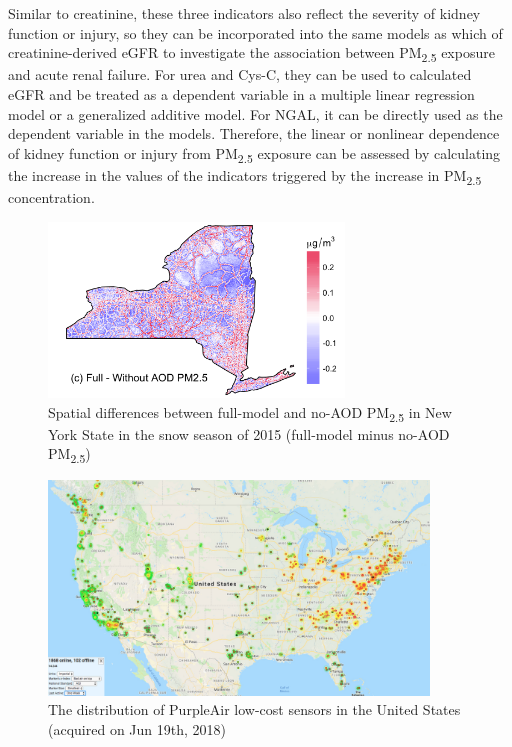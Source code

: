 \documentclass[11pt]{article}
\newcommand{\tsub}{\textsubscript}
\begin{document}
\begin{enumerate*}[{[a)]}]
{\begin{enumerate*}[{[1)]}]
        \end{enumerate*}
    }
    \item Similar to creatinine, these three indicators also reflect the severity of kidney function or injury, so they can be incorporated into the same models as which of creatinine-derived eGFR to investigate the association between PM\tsub{2.5} exposure and acute renal failure. For urea and Cys-C, they can be used to calculated eGFR and be treated as a dependent variable in a multiple linear regression model or a generalized additive model. For NGAL, it can be directly used as the dependent variable in the models. Therefore, the linear or nonlinear dependence of kidney function or injury from PM\tsub{2.5} exposure can be assessed by calculating the increase in the values of the indicators triggered by the increase in PM\tsub{2.5} concentration.
\end{enumerate*}


\newpage

\begin{figure}[H]
    \centering
    \includegraphics[width=0.7\textwidth]{img/no_aod.png}
    \caption{Spatial differences between full-model and no-AOD PM\tsub{2.5} in New York State in the snow season of 2015 (full-model minus no-AOD PM\tsub{2.5})}
    \label{fig:noaod}
\end{figure}

\begin{figure}[H]
    \centering
    \includegraphics[width=0.9\textwidth]{img/purpleair.jpg}
    \caption{The distribution of PurpleAir low-cost sensors in the United States (acquired on Jun 19th, 2018)}
    \label{fig:pa}
\end{figure}
\end{document}
